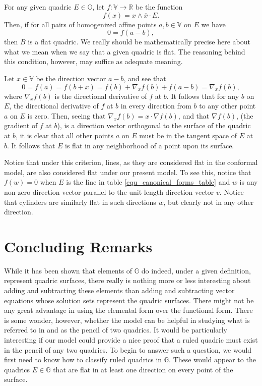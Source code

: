 \documentclass{birkjour}
\theoremstyle{definition}
\theoremstyle{remark}
\numberwithin{equation}{section}
\newcommand{\G}{\mathbb{G}}
\newcommand{\V}{\mathbb{V}}
\newcommand{\R}{\mathbb{R}}
\begin{document}
For any given quadric $E\in\G$, let $f:\V\to\R$ be the function
\begin{equation}
f(x) = x\wedge\overline{x}\cdot E.
\end{equation}
Then, if for all pairs of homogenized affine points $a,b\in\V$
on $E$ we have
\begin{equation}
0=f(a-b),
\end{equation}
then $B$ is a flat quadric.  We really
should be mathematically precise here about what we mean when
we say that a given quadric is flat.  The reasoning behind this
condition, however, may suffice as adequate meaning.

Let $x\in\V$ be the direction vector $a-b$, and see that
\begin{equation}
0=f(a) = f(b+x) = f(b) + \nabla_x f(b) + f(a-b) = \nabla_x f(b),
\end{equation}
where $\nabla_x f(b)$ is the directional derivative of $f$ at $b$.
It follows that for any $b$ on $E$, the directional derivative of $f$ at $b$ in every
direction from $b$ to any other point $a$ on $E$ is zero.  Then, seeing that
$\nabla_x f(b)=x\cdot\nabla f(b)$, and that $\nabla f(b)$, (the gradient of
$f$ at $b$), is a direction vector orthogonal to the surface of the quadric at $b$,
it is clear that all other points $a$ on $E$ must be in the tangent space
of $E$ at $b$.  It follows that $E$ is flat in any neighborhood of a point
upon its surface.

Notice that under this criterion, lines, as they are considered flat in the conformal
model, are also considered flat under our present model.  To see this, notice that $f(w)=0$ when
$E$ is the line in table \eqref{equ_canonical_forms_table} and $w$ is any non-zero direction
vector parallel to the unit-length direction vector $v$.  Notice that cylinders are similarly
flat in such directions $w$, but clearly not in any other direction.

\section{Concluding Remarks}

While it has been shown that elements of $\G$ do indeed, under a given
definition, represent quadric surfaces, there really is nothing more or less
interesting about adding and subtracting these elements than adding and
subtracting vector equations whose solution sets represent the quadric surfaces.
There might not be any great advantage in using the elemental form over the
functional form.  There is some wonder, however, whether the model can
be helpful in studying what is referred to in \cite{Miller87}
and \cite{ZhiqiangXu05} as the pencil of two quadrics.
It would be particularly interesting if our model could provide a nice proof
that a ruled quadric must exist in the pencil of any two quadrics.
To begin to answer such a question, we would first need to know
how to classify ruled quadrics in $\G$.  These would appear to the
quadrics $E\in\G$ that are flat in at least one direction on every point
of the surface.
\end{document}
